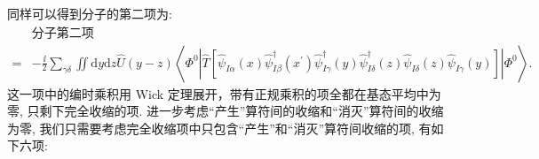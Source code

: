 同样可以得到分子的第二项为:
\begin{equation}
\begin{aligned}
&\text{分子第二项}\\
=&-\frac{\ii}{2} \sum_{\gamma\delta} \iint \mathrm{d} y \mathrm{d} z \hat U(y-z)\left\langle\Phi^{0}\left|\hat{T}\left[\hat{\psi}^{}_{I \alpha}(x) \hat{\psi}_{I \beta}^{\dagger}(x^{\prime}) \hat{\psi}_{I \gamma}^{\dagger}(y) \hat{\psi}_{I \delta}^{\dagger}(z) \hat{\psi}^{}_{I \delta}(z) \hat{\psi}^{}_{I \gamma}(y)\right]\right| \Phi^{0}\right\rangle .
\end{aligned}
\end{equation}
这一项中的编时乘积用 Wick 定理展开，带有正规乘积的项全都在基态平均中为零, 只剩下完全收缩的项. 进一步考虑“产生”算符间的收缩和“消灭”算符间的收缩为零, 我们只需要考虑完全收缩项中只包含“产生”和“消灭”算符间收缩的项, 有如下六项:
